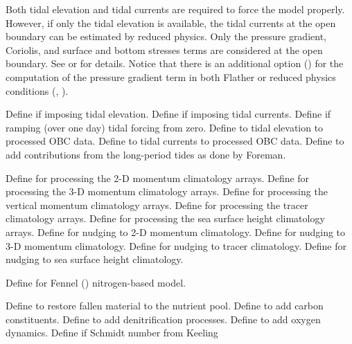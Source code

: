 \begin{klist}
Both tidal elevation and tidal currents are required to force the model
properly. However, if only the tidal elevation is available, the tidal
currents at the open boundary can be estimated by reduced physics.
Only the pressure gradient, Coriolis, and surface and bottom stresses
terms are considered at the open boundary. See  or
 for details. Notice that there is an additional option
() for the computation of the pressure gradient
term in both Flather or reduced physics conditions (,
).
  \begin{klist}
      Define if imposing tidal elevation.
      Define if imposing tidal currents.
      Define if ramping (over one day) tidal forcing
     from zero.
      Define to tidal elevation to processed OBC data.
      Define to tidal currents to processed OBC data.
      Define to add contributions from the
     long-period tides as done by Foreman.
  \end{klist}
   \mbox{}
  \begin{klist}
      Define for processing the 2-D momentum
   climatology arrays.
      Define for processing the 3-D momentum
   climatology arrays.
      Define for processing the vertical momentum
   climatology arrays.
      Define for processing the tracer climatology arrays.
      Define for processing the sea surface height
   climatology arrays.
          Define for nudging to 2-D momentum
   climatology.
          Define for nudging to 3-D momentum
   climatology.
          Define for nudging to tracer climatology.
          Define for nudging to sea surface height
   climatology.
  \end{klist}
   \mbox{}
  \begin{klist}
     Define for Fennel (\cite{Fennel_2006})
    nitrogen-based model.
    \begin{klist}
        Define to restore fallen material to the
       nutrient pool.
        Define to add carbon constituents.
        Define to add denitrification processes.
        Define to add oxygen dynamics.
        Define if Schmidt number from Keeling

\end{klist}
\end{klist}
\end{klist}
